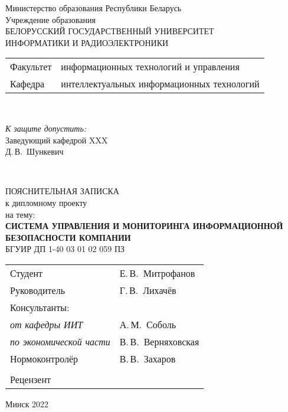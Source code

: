 \begin{titlepage}
  \begin{center}
    Министерство образования Республики Беларусь\\[1em]
    Учреждение образования\\
    БЕЛОРУССКИЙ ГОСУДАРСТВЕННЫЙ УНИВЕРСИТЕТ \\
    ИНФОРМАТИКИ И РАДИОЭЛЕКТРОНИКИ\\[1em]

    \begin{minipage}{\textwidth}
      \begin{flushleft}
        \begin{tabular}{ l l }
          Факультет & информационных технологий и управления\\[1em]
          Кафедра   & интеллектуальных информационных технологий
        \end{tabular}
      \end{flushleft}
    \end{minipage}\\[1em]

    \begin{flushright}
      \begin{minipage}{0.4\textwidth}
        \textit{К защите допустить:}\\
        Заведующий кафедрой XXX\\[0.45em]
        \underline{\hspace*{2.8cm}} Д.\,В.~Шункевич
      \end{minipage}\\[2.2em]
    \end{flushright}

    {ПОЯСНИТЕЛЬНАЯ ЗАПИСКА}\\
    {к дипломному проекту}\\
    {на тему:}\\[1em]
    \textbf{\large СИСТЕМА УПРАВЛЕНИЯ И МОНИТОРИНГА ИНФОРМАЦИОННОЙ БЕЗОПАСНОСТИ КОМПАНИИ}\\[1em]


    {БГУИР ДП 1-40 03 01 02 059 ПЗ}\\[2em]
    
    \begin{tabular}{ p{}p{} }
      Студент & Е.\,В.~Митрофанов \\
      Руководитель & Г.\,В.~Лихачёв \\
      Консультанты: &\\
      \hspace*{3ex}\emph{от кафедры ИИТ} & А.\,М.~Соболь \\
      \hspace*{3ex}\emph{по экономической части} & В.\,В.~Верняховская \\
      Нормоконтролёр & В.\,В.~Захаров\\
      & \\
      Рецензент &
    \end{tabular}
    
    \vfill
    {\normalsize Минск 2022}
  \end{center}
\end{titlepage}